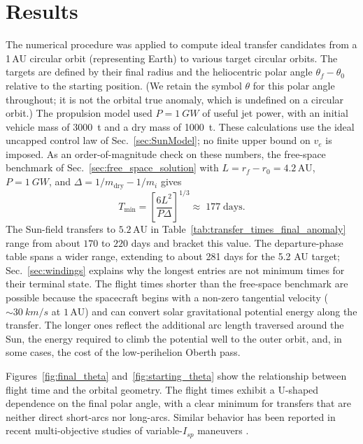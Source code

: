 \documentclass[journal,a4paper]{IEEEtran}
\begin{document}
\section{Results}
The numerical procedure was applied to compute ideal transfer candidates from a 1\,AU circular orbit (representing Earth) to various target circular orbits. The targets are defined by their final radius and the heliocentric polar angle $\theta_f-\theta_0$ relative to the starting position. (We retain the symbol $\theta$ for this polar angle throughout; it is not the orbital true anomaly, which is undefined on a circular orbit.) The propulsion model used \(P=\SI{1}{GW}\) of useful jet power, with an initial vehicle mass of \SI{3000}{t} and a dry mass of \SI{1000}{t}. These calculations use the ideal uncapped control law of Sec.~\ref{sec:SunModel}; no finite upper bound on \(v_e\) is imposed.
As an order-of-magnitude check on these numbers, the free-space benchmark of Sec.~\ref{sec:free_space_solution} with \(L=r_f-r_0=4.2\,\mathrm{AU}\), \(P=\SI{1}{GW}\), and \(\Delta=1/m_\mathrm{dry}-1/m_i\) gives
\begin{equation*}
T_{\min}
=\!\left[\frac{6L^{2}}{P\Delta}\right]^{1/3}
\!\approx\;177\;\mathrm{days}.
\end{equation*}
The Sun-field transfers to \(5.2\,\mathrm{AU}\) in Table~\ref{tab:transfer_times_final_anomaly} range from about \(170\) to \(220\) days and bracket this value. The departure-phase table spans a wider range, extending to about 281 days for the 5.2 AU target; Sec.~\ref{sec:windings} explains why the longest entries are not minimum times for their terminal state. The flight times shorter than the free-space benchmark are possible because the spacecraft begins with a non-zero tangential velocity (\(\sim\SI{30}{km/s}\) at \(1\,\mathrm{AU}\)) and can convert solar gravitational potential energy along the transfer. The longer ones reflect the additional arc length traversed around the Sun, the energy required to climb the potential well to the outer orbit, and, in some cases, the cost of the low-perihelion Oberth pass.

Figures~\ref{fig:final_theta} and~\ref{fig:starting_theta} show the relationship between flight time and the orbital geometry. The flight times exhibit a U-shaped dependence on the final polar angle, with a clear minimum for transfers that are neither direct short-arcs nor long-arcs. Similar behavior has been reported in recent multi-objective studies of variable-$I_{\!sp}$ maneuvers \cite{DiPasquale2024}.
\end{document}
